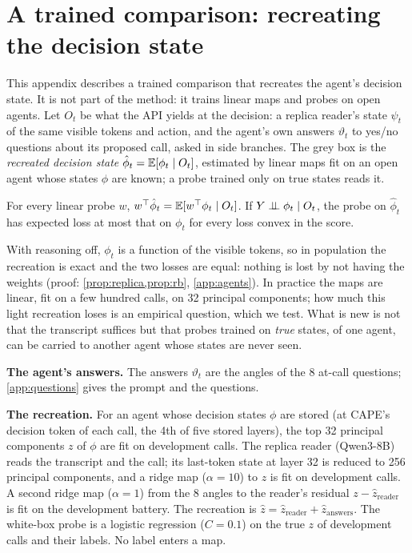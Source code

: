 \section{A trained comparison: recreating the decision state}
\label{app:greybox}
This appendix describes a trained comparison that recreates the agent's decision state. It is not part of the method: it trains linear maps and probes on open agents. Let $O_t$ be what the API yields at the decision: a replica reader's state $\psi_t$ of the same visible tokens and action, and the agent's own answers $\vartheta_t$ to yes/no questions about its proposed call, asked in side branches. The grey box is the \emph{recreated decision state} $\hat\phi_t=\mathbb{E}[\phi_t\mid O_t]$, estimated by linear maps fit on an open agent whose states $\phi$ are known; a probe trained only on true states reads it.
\begin{proposition}\label{prop:greybox}
For every linear probe $w$, $w^\top\hat\phi_t=\mathbb{E}[w^\top\phi_t\mid O_t]$. If $Y\perp\!\!\!\perp\phi_t\mid O_t$, the probe on $\hat\phi_t$ has expected loss at most that on $\phi_t$ for every loss convex in the score.
\end{proposition}
With reasoning off, $\phi_t$ is a function of the visible tokens, so in population the recreation is exact and the two losses are equal: nothing is lost by not having the weights (proof: \cref{prop:replica,prop:rb}, \cref{app:agents}). In practice the maps are linear, fit on a few hundred calls, on 32 principal components; how much this light recreation loses is an empirical question, which we test. What is new is not that the transcript suffices but that probes trained on \emph{true} states, of one agent, can be carried to another agent whose states are never seen.

\textbf{The agent's answers.} The answers $\vartheta_t$ are the angles of the 8 at-call questions; \cref{app:questions} gives the prompt and the questions.

\textbf{The recreation.} For an agent whose decision states $\phi$ are stored (at CAPE's decision token of each call, the 4th of five stored layers), the top 32 principal components $z$ of $\phi$ are fit on development calls. The replica reader (Qwen3-8B) reads the transcript and the call; its last-token state at layer 32 is reduced to 256 principal components, and a ridge map ($\alpha=10$) to $z$ is fit on development calls. A second ridge map ($\alpha=1$) from the 8 angles to the reader's residual $z-\hat z_{\mathrm{reader}}$ is fit on the development battery. The recreation is $\hat z=\hat z_{\mathrm{reader}}+\hat z_{\mathrm{answers}}$. The white-box probe is a logistic regression ($C=0.1$) on the true $z$ of development calls and their labels. No label enters a map.

